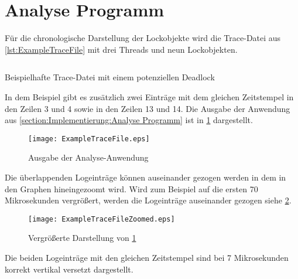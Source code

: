 \section{Analyse Programm}
\label{section:ValidierungAnalyseProgramm}
Für die chronologische Darstellung der Lockobjekte wird die Trace-Datei aus
\cref{lst:ExampleTraceFile} mit drei Threads und neun Lockobjekten.
\begin{listing}[ht]
  \begin{minipage}[ht]{\linewidth}
    \begin{multicols}{3}
      \inputminted[linenos]{text}{./Examples/ExampleTraceFile.log}
    \end{multicols}
    \caption{Beispielhafte Trace-Datei mit einem potenziellen Deadlock}
    \label{lst:ExampleTraceFile}
  \end{minipage}
\end{listing}
In dem Beispiel gibt es zusätzlich zwei Einträge mit dem gleichen Zeitstempel in
den Zeilen 3 und 4 sowie in den Zeilen 13 und 14. Die Ausgabe der Anwendung aus
\cref{section:Implementierung:Analyse Programm} ist in
\cref{fig:LockTraceVisualization} dargestellt.
\begin{figure}[ht]
  \texttt{[image: ExampleTraceFile.eps]}
  \caption{Ausgabe der Analyse-Anwendung}
  \label{fig:LockTraceVisualization}
\end{figure}
Die überlappenden Logeinträge können auseinander gezogen werden in dem in den
Graphen hineingezoomt wird. Wird zum Beispiel auf die ersten 70 Mikrosekunden
vergrößert, werden die Logeinträge auseinander gezogen siehe
\cref{fig:LockTraceVisualizationZoomed}.
\begin{figure}[ht]
  \texttt{[image: ExampleTraceFileZoomed.eps]}
  \caption{Vergrößerte Darstellung von \cref{fig:LockTraceVisualization}}
  \label{fig:LockTraceVisualizationZoomed}
\end{figure}
Die beiden Logeinträge mit den gleichen Zeitstempel sind bei 7 Mikrosekunden
korrekt vertikal versetzt dargestellt.


